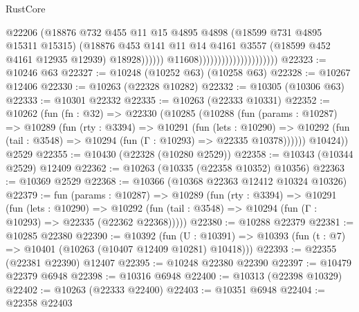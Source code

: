 \begin{lexlean}{RustCore}
\begin{coremodule}
                                                      @22206
                                                      (@18876
                                                        @732
                                                        @455
                                                        @11
                                                        @15
                                                        @4895
                                                        @4898
                                                        (@18599 @731 @4895 @15311 @15315)
                                                        (@18876
                                                          @453
                                                          @141
                                                          @11
                                                          @14
                                                          @4161
                                                          @3557
                                                          (@18599 @452 @4161 @12935 @12939)
                                                          @18928))))))
                                              @11608)))))))))))))))))))))
@22323 := @10246 @63
@22327 := @10248 (@10252 @63) (@10258 @63)
@22328 := @10267 @12406
@22330 := @10263 (@22328 @10282)
@22332 := @10305 (@10306 @63)
@22333 := @10301 @22332
@22335 := @10263 (@22333 @10331)
@22352 := @10262
    (fun (fn : @32) =>
    @22330
      (@10285
        (@10288
          (fun (params : @10287) =>
          @10289
            (fun (rty : @3394) =>
            @10291
              (fun (lets : @10290) =>
              @10292 (fun (tail : @3548) => @10294 (fun (Γ : @10293) => @22335 @10378))))))
        @10424))
    @2529
@22355 := @10430 (@22328 (@10280 @2529))
@22358 := @10343 (@10344 @2529) @12409
@22362 := @10263 (@10335 (@22358 @10352) @10356)
@22363 := @10369 @2529
@22368 := @10366 (@10368 @22363 @12412 @10324 @10326)
@22379 := fun (params : @10287) =>
  @10289
    (fun (rty : @3394) =>
    @10291
      (fun (lets : @10290) =>
      @10292 (fun (tail : @3548) => @10294 (fun (Γ : @10293) => @22335 (@22362 @22368)))))
@22380 := @10288 @22379
@22381 := @10285 @22380
@22390 := @10392
    (fun (U : @10391) => @10393 (fun (t : @7) => @10401 (@10263 (@10407 @12409 @10281) @10418)))
@22393 := @22355 (@22381 @22390) @12407
@22395 := @10248 @22380 @22390
@22397 := @10479 @22379 @6948
@22398 := @10316 @6948
@22400 := @10313 (@22398 @10329)
@22402 := @10263 (@22333 @22400)
@22403 := @10351 @6948
@22404 := @22358 @22403

\end{coremodule}
\end{lexlean}
